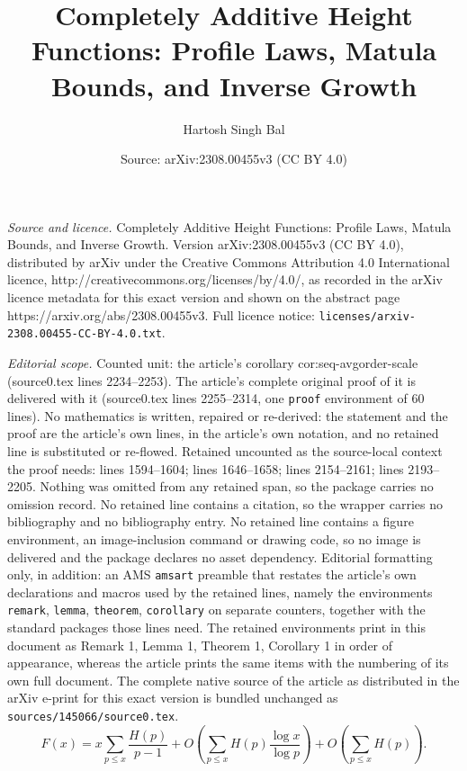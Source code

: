 \documentclass[10pt,a4paper]{amsart}
\title{Completely Additive Height Functions: Profile Laws, Matula Bounds, and Inverse Growth}
\author{Hartosh Singh Bal}
\date{Source: arXiv:2308.00455v3 (CC BY 4.0)}
\begin{document}
\maketitle

\noindent\emph{Source and licence.} Completely Additive Height Functions: Profile Laws, Matula Bounds, and Inverse Growth. Version arXiv:2308.00455v3 (CC BY 4.0), distributed by arXiv under the Creative Commons Attribution 4.0 International licence, http://creativecommons.org/licenses/by/4.0/, as recorded in the arXiv licence metadata for this exact version and shown on the abstract page https://arxiv.org/abs/2308.00455v3. Full licence notice: \texttt{licenses/arxiv-2308.00455-CC-BY-4.0.txt}.\par\smallskip

\noindent\textit{Editorial scope.} Counted unit: the article's corollary cor:seq-avgorder-scale (source0.tex lines 2234--2253). The article's complete original proof of it is delivered with it (source0.tex lines 2255--2314, one \texttt{proof} environment of 60 lines). No mathematics is written, repaired or re-derived: the statement and the proof are the article's own lines, in the article's own notation, and no retained line is substituted or re-flowed.  Retained uncounted as the source-local context the proof needs: lines 1594--1604; lines 1646--1658; lines 2154--2161; lines 2193--2205.  Nothing was omitted from any retained span, so the package carries no omission record.  No retained line contains a citation, so the wrapper carries no bibliography and no bibliography entry.  No retained line contains a figure environment, an image-inclusion command or drawing code, so no image is delivered and the package declares no asset dependency.  Editorial formatting only, in addition: an AMS \texttt{amsart} preamble that restates the article's own declarations and macros used by the retained lines, namely the environments \texttt{remark}, \texttt{lemma}, \texttt{theorem}, \texttt{corollary} on separate counters, together with the standard packages those lines need.  The retained environments print in this document as Remark 1, Lemma 1, Theorem 1, Corollary 1 in order of appearance, whereas the article prints the same items with the numbering of its own full document.  The complete native source of the article as distributed in the arXiv e-print for this exact version is bundled unchanged as \texttt{sources/145066/source0.tex}.
\begin{equation}\label{eq:Fx-main-term}
  F(x)
  =
  x\sum_{p\le x}\frac{H(p)}{p-1}
  +
  O\!\left(
    \sum_{p\le x} H(p)\frac{\log x}{\log p}
  \right)
  +
  O\!\left(\sum_{p\le x}H(p)\right).
\end{equation}
\end{document}
